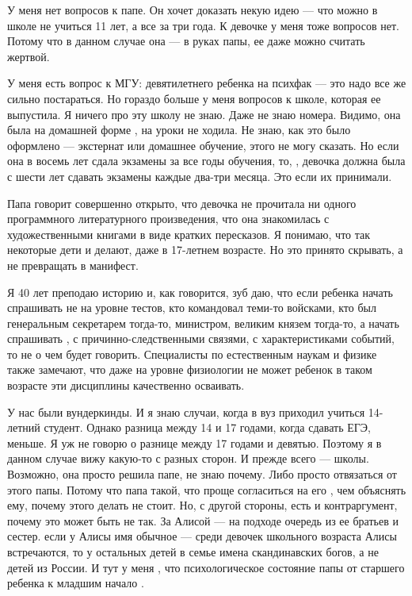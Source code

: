 У меня нет вопросов к папе. Он хочет доказать некую идею --- что можно в школе не учиться 11 лет, а  все за три года. К девочке у меня тоже вопросов нет. Потому что в данном случае она ---  в руках папы,  ее даже можно считать жертвой.

У меня есть вопрос к МГУ:  девятилетнего ребенка на психфак --- это надо все же сильно постараться.  Но гораздо больше у меня вопросов к школе,  которая ее  выпустила. Я ничего про эту школу не знаю. Даже не знаю номера. Видимо, она была на домашней форме   , на уроки не ходила. Не знаю, как это было оформлено --- экстернат или домашнее обучение, этого не могу сказать. Но если она в восемь лет сдала экзамены за все годы обучения, то, , девочка должна была с шести лет сдавать экзамены каждые два-три месяца. Это если их принимали.

Папа говорит совершенно открыто, что девочка не прочитала ни одного программного литературного произведения, что она знакомилась с художественными книгами в виде кратких пересказов. Я понимаю, что так некоторые дети и делают, даже в 17-летнем возрасте. Но  это принято скрывать, а не превращать в манифест.

Я 40 лет преподаю историю и, как говорится, зуб даю, что если ребенка начать спрашивать не на уровне тестов, кто командовал теми-то войсками, кто был генеральным секретарем тогда-то, министром, великим князем тогда-то, а начать спрашивать , с причинно-следственными связями, с характеристиками событий, то не о чем будет говорить. Специалисты по естественным наукам и физике также замечают, что даже на уровне физиологии не может ребенок в таком возрасте эти дисциплины качественно осваивать.

У нас были вундеркинды. И я знаю случаи, когда в вуз приходил учиться 14-летний студент. Однако разница между 14 и 17 годами, когда  сдавать ЕГЭ,  меньше.
Я уж не говорю о разнице между 17 годами и девятью. Поэтому я в данном случае вижу какую-то  с разных сторон. И прежде всего --- школы.
Возможно, она просто решила  папе, не знаю почему. Либо просто отвязаться от этого папы. Потому что папа такой, что проще согласиться на его , чем объяснять ему, почему этого делать не стоит.
Но, с другой стороны, есть и контраргумент, почему это может быть не так. За Алисой --- на подходе очередь из ее братьев и сестер.  если у Алисы имя обычное --- среди девочек школьного возраста Алисы встречаются, то у остальных детей в семье имена скандинавских богов, а не детей из России. И тут у меня , что психологическое состояние папы от старшего ребенка к младшим начало .

